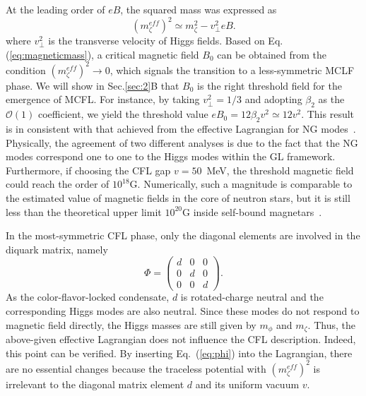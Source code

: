 \documentclass[prd, showpacs,nofootinbib,amsmath,amssymb]{revtex4}
\begin{document}
At the leading order of $eB$, the squared mass was expressed as \cite{zhang2015magnetic}
\begin{equation}
\label{eq:magneticmass}
(m_\zeta^{eff})^2 \simeq m_\zeta^2 - v_\perp^2eB.
\end{equation}
where $v_\perp^2$ is the transverse velocity of Higgs fields.
Based on Eq.(\ref{eq:magneticmass}), a critical magnetic field $B_0$ can be obtained from the condition $(m_\zeta^{eff})^2 \rightarrow 0$, which signals the transition to a less-symmetric
MCLF phase. We will show in Sec.\ref{sec:2}B that $B_0$ is the right threshold field for the emergence of MCFL.
For instance, by taking $v_\perp^2=1/3$ and adopting $\beta_2$ as
the $\mathscr{O}(1)$ coefficient, we yield the threshold value $eB_0 = 12\beta_2 v^2 \simeq 12v^2$.
This result is in consistent with that achieved from the effective Lagrangian for NG
modes~\cite{ferrer2007magnetic}. Physically, the agreement of two different analyses is due to
the fact that the NG modes correspond one to one to the Higgs modes within the GL framework.
Furthermore, if choosing the CFL gap $v = 50$~MeV, the threshold magnetic field could reach the
order of $10^{18}\text{G}$. Numerically, such a magnitude is comparable to the estimated value of
magnetic fields in the core of neutron stars, but it is still less than the theoretical upper
limit $10^{20}\text{G}$ inside self-bound magnetars~\cite{dong2001,lai1991cold}.


In the most-symmetric CFL phase, only the diagonal elements are involved in the diquark matrix, namely
\begin{equation}
  \label{eq:phi}
  \Phi =
  \begin{pmatrix}
    d & 0 & 0 \\
    0 & d & 0 \\
    0 & 0 & d
    \end{pmatrix}.\end{equation}
As the color-flavor-locked condensate, $d$ is rotated-charge neutral and the corresponding Higgs
modes are also neutral. Since these modes do not respond to magnetic field directly, the Higgs
masses are still given by $m_\phi$ and $m_\zeta$. Thus, the above-given effective Lagrangian does
not influence the CFL description. Indeed, this point can be verified. By inserting Eq.~(\ref{eq:phi})
into the Lagrangian, there are no essential changes because the traceless potential with
$(m_\zeta^{eff})^2$ is irrelevant to the diagonal matrix element $d$ and its uniform vacuum $v$.
\end{document}
